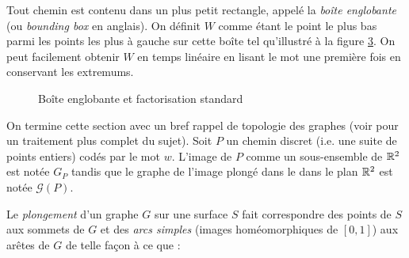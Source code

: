 Tout chemin est contenu dans un plus petit rectangle, appelé la \emph{boîte englobante} (ou \emph{bounding box} en anglais). On définit $W$ comme étant le point le plus bas parmi les points les plus à gauche sur cette boîte tel qu'illustré à la figure \ref{fig:point-W}. On peut facilement obtenir $W$ en temps linéaire en lisant le mot une première fois en conservant les extremums.


\begin{figure}
\begin{subfigure}[b]{.5\linewidth}
\centering
\shorthandoff{:}
\caption{}\label{fig:point-Wa}
\end{subfigure}
\begin{subfigure}[b]{.5\linewidth}
\centering
\shorthandoff{:}
\caption{}\label{fig:point-Wb}
\end{subfigure}
\caption{Boîte englobante et factorisation standard}\label{fig:point-W}
\end{figure}

On termine cette section avec un bref rappel de topologie des graphes (voir \cite{gross87} pour un traitement plus complet du sujet). Soit $P$ un chemin discret (i.e. une suite de points entiers) codés par le mot $w$. L'image de $P$ comme un sous-ensemble de $\mathbb{R}^2$ est notée $G_P$ tandis que le graphe de l'image plongé dans le dans le plan $\mathbb{R}^2$ est notée $\mathcal{G}(P)$.

Le \emph{plongement} d'un graphe $G$ sur une surface $S$ fait correspondre des points de $S$ aux sommets de $G$ et des \emph{arcs simples} (images homéomorphiques de $[0,1]$) aux arêtes de $G$ de telle façon à ce que :

